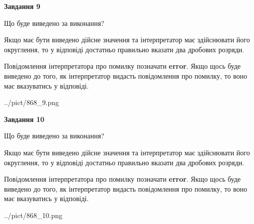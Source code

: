 \documentclass[12pt, ukrainian]{article}
\begin{document}
{\begin {Large}
{\begin {center}\textbf{Завдання 9}\end {center}}\par
Що буде виведено за виконання? \par

Якщо має бути виведено дійсне значення та інтерпретатор має здійснювати його округлення, 
то у відповіді достатньо правильно вказати два дробових розряди.

Повідомлення інтерпретатора про помилку позначати \textbf{error}.
Якщо щось буде виведено до того, як інтерпретатор видасть повідомлення про помилку, 
то воно має вказуватись у відповіді. \par

\begin{center}
	{../pict/868_9.png}
\end{center}
\newpage

{\begin {center}\textbf{Завдання 10}\end {center}}\par
Що буде виведено за виконання? \par

Якщо має бути виведено дійсне значення та інтерпретатор має здійснювати його округлення, 
то у відповіді достатньо правильно вказати два дробових розряди.

Повідомлення інтерпретатора про помилку позначати \textbf{error}.
Якщо щось буде виведено до того, як інтерпретатор видасть повідомлення про помилку, 
то воно має вказуватись у відповіді. \par

\begin{center}
	{../pict/868_10.png}
\end{center}
\newpage

\end {Large}}
\end{document}
